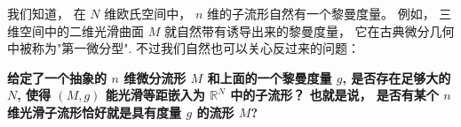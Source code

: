 
\begin{issues}
\issueDraft
\end{issues}


我们知道， 在 $N$ 维欧氏空间中， $n$ 维的子流形自然有一个黎曼度量。 例如， 三维空间中的二维光滑曲面 $M$ 就自然带有诱导出来的黎曼度量， 它在古典微分几何中被称为"第一微分型". 不过我们自然也可以关心反过来的问题： 

\textbf{给定了一个抽象的 $n$ 维微分流形 $M$ 和上面的一个黎曼度量 $g$, 是否存在足够大的 $N$, 使得 $(M,g)$ 能光滑等距嵌入为 $\mathbb{R}^N$ 中的子流形？ 也就是说， 是否有某个 $n$ 维光滑子流形恰好就是具有度量 $g$ 的流形 $M$?}

